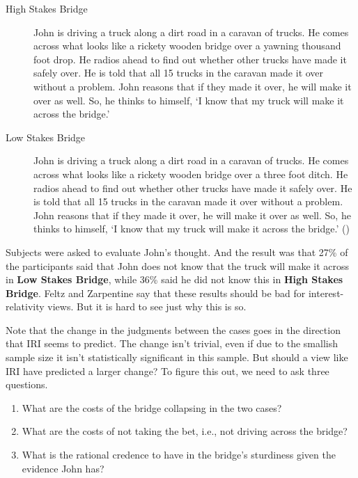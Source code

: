 \documentclass[
  11pt,
  letterpaper,
  DIV=11,
  numbers=noendperiod,
  oneside]{scrartcl}
\providecommand{\tightlist}{%
  \setlength{\itemsep}{0pt}\setlength{\parskip}{0pt}}\usepackage{longtable,booktabs,array}
\begin{document}
\begin{description}
\item[High Stakes Bridge]
John is driving a truck along a dirt road in a caravan of trucks. He
comes across what looks like a rickety wooden bridge over a yawning
thousand foot drop. He radios ahead to find out whether other trucks
have made it safely over. He is told that all 15 trucks in the caravan
made it over without a problem. John reasons that if they made it over,
he will make it over as well. So, he thinks to himself, `I know that my
truck will make it across the bridge.'
\item[Low Stakes Bridge]
John is driving a truck along a dirt road in a caravan of trucks. He
comes across what looks like a rickety wooden bridge over a three foot
ditch. He radios ahead to find out whether other trucks have made it
safely over. He is told that all 15 trucks in the caravan made it over
without a problem. John reasons that if they made it over, he will make
it over as well. So, he thinks to himself, `I know that my truck will
make it across the bridge.' ()
\end{description}

Subjects were asked to evaluate John's thought. And the result was that
27\% of the participants said that John does not know that the truck
will make it across in \textbf{Low Stakes Bridge}, while 36\% said he
did not know this in \textbf{High Stakes Bridge}. Feltz and Zarpentine
say that these results should be bad for interest-relativity views. But
it is hard to see just why this is so.

Note that the change in the judgments between the cases goes in the
direction that IRI seems to predict. The change isn't trivial, even if
due to the smallish sample size it isn't statistically significant in
this sample. But should a view like IRI have predicted a larger change?
To figure this out, we need to ask three questions.

\begin{enumerate}
\def\labelenumi{\arabic{enumi}.}
\tightlist
\item
  What are the costs of the bridge collapsing in the two cases?
\item
  What are the costs of not taking the bet, i.e., not driving across the
  bridge?
\item
  What is the rational credence to have in the bridge's sturdiness given
  the evidence John has?
\end{enumerate}
\end{document}
